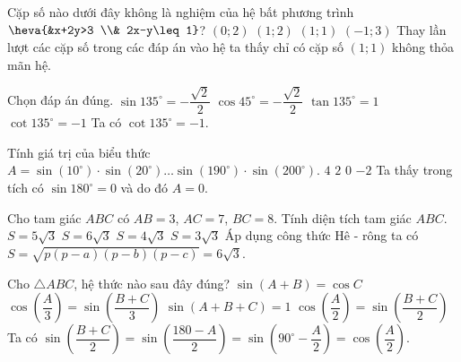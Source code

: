 \begin{ex}%
	Cặp số nào dưới đây không là nghiệm của hệ bất phương trình $\heva{&x+2y>3 \\& 2x-y\leq 1}$?
	\choice
	{$(0;2)$}
	{$(1;2)$}
	{\True $(1;1)$}
	{$(-1;3)$}
	\loigiai
	{
		Thay lần lượt các cặp số trong các đáp án vào hệ ta thấy chỉ có cặp số $(1;1)$ không thỏa mãn hệ. 
	}
\end{ex}

\begin{ex}%
	Chọn đáp án đúng. 
	\choice
	{$\sin 135^{\circ}=-\dfrac{\sqrt{2}}{2}$}
	{$\cos 45^{\circ}=-\dfrac{\sqrt{2}}{2}$}
	{$\tan 135^{\circ}=1$}
	{\True $\cot 135^{\circ}=-1$}
	\loigiai
	{
		Ta có $\cot 135^{\circ}=-1$.
	}
\end{ex}

\begin{ex}%
	Tính giá trị của biểu thức $A=\sin (10^{\circ}) \cdot \sin (20^{\circ}) \ldots \sin (190^{\circ}) \cdot \sin (200^{\circ})$.
	\choice
	{$4$}
	{$2$}
	{\True $0$}
	{$-2$}
	\loigiai
	{
		Ta thấy trong tích có $\sin 180^{\circ}=0$ và do đó $A=0$.
	}
\end{ex}

\begin{ex}%
	Cho tam giác $ABC$ có $AB=3$, $AC=7$, $BC=8$. Tính diện tích tam giác $ABC$.
	\choice
	{$S=5\sqrt{3}$}
	{\True $S=6\sqrt{3}$}
	{$S=4\sqrt{3}$}
	{$S=3\sqrt{3}$}
	\loigiai
	{
		Áp dụng công thức Hê - rông ta có $S=\sqrt{p(p-a)(p-b)(p-c)}=6\sqrt{3}$.
	}
\end{ex}

\begin{ex}%
	Cho $\triangle ABC$, hệ thức nào sau đây đúng?
	\choice
	{$\sin (A+B)=\cos C$}
	{$\cos \left(\dfrac{A}{3}\right)=\sin \left(\dfrac{B+C}{3}\right)$}
	{$\sin (A+B+C)=1$}
	{\True $\cos \left(\dfrac{A}{2}\right)=\sin \left(\dfrac{B+C}{2}\right)$}
	\loigiai
	{
		Ta có $\sin \left(\dfrac{B+C}{2}\right)=\sin \left(\dfrac{180-A}{2}\right)=\sin \left( 90^{\circ}-\dfrac{A}{2}\right)=\cos \left(\dfrac{A}{2}\right)$.
	}
\end{ex}


